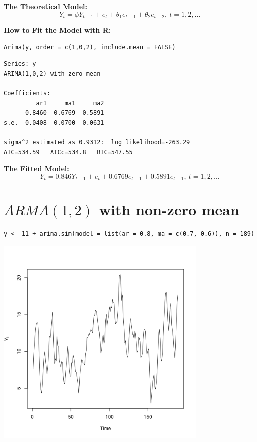 \documentclass[12pt]{article}
\begin{document}
\noindent
\textbf{The Theoretical Model:} 
\[
Y_{t} = \phi Y_{t - 1} + e_{t} + \theta_{1} e_{t - 1} + \theta_{2} e_{t - 2},\ t = 1,2,\ldots
\]

\noindent
\textbf{How to Fit the Model with R:}


\begin{verbatim}
Arima(y, order = c(1,0,2), include.mean = FALSE)
\end{verbatim}




\begin{verbatim}
Series: y 
ARIMA(1,0,2) with zero mean     

Coefficients:
         ar1     ma1     ma2
      0.8460  0.6769  0.5891
s.e.  0.0408  0.0700  0.0631

sigma^2 estimated as 0.9312:  log likelihood=-263.29
AIC=534.59   AICc=534.8   BIC=547.55
\end{verbatim}

\noindent
\textbf{The Fitted Model:} 
\[
Y_{t} = 0.846 Y_{t - 1} + e_{t} + 0.6769 e_{t - 1} + 0.5891 e_{t - 1},\ t = 1,2,\ldots
\]
\section*{$ARMA(1,2)$ with non-zero mean}
\label{sec-6}


\begin{verbatim}
y <- 11 + arima.sim(model = list(ar = 0.8, ma = c(0.7, 0.6)), n = 189)
\end{verbatim}





\includegraphics[width=4.0in]{img/arma12nzm.png}
\end{document}
